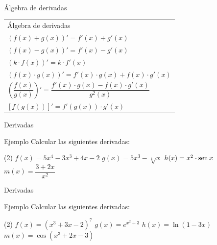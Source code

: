 \documentclass[8pt]{beamer}
\newcommand{\sen}{\mathop{\rm sen}\nolimits}
\begin{document}
\begin{frame}{Álgebra de derivadas}

\setlength{\arrayrulewidth}{0.2mm}
\setlength{\tabcolsep}{10pt}
\renewcommand{\arraystretch}{2}
\begin{center}
\begin{tabular}{|p{8cm}|}
\hline
\rowcolor{lightgray} {\huge{Álgebra de derivadas}} \\

	 $\left( f(x)+g(x) \right)' =f'(x) + g'(x) $ \\
\rowcolor{verdep}	  $\left( f(x)-g(x) \right)' =f'(x) - g'(x) $ \\
	 $\left( k\cdot f(x) \right)' =k\cdot f'(x) $ \\
\rowcolor{verdep}	 $\left( f(x) \cdot g(x) \right)' =f'(x)\cdot g(x)  + f(x) \cdot g'(x) $ \\
   
	  $\left( \dfrac{f(x)}{g(x)} \right)' =\dfrac {f'(x)\cdot g(x)-f(x)\cdot  g'(x)}{g^2(x)} $ \\
\rowcolor{verdep}	 $ \left[ f\left(g(x) \right)\right]' =f'\left(g(x) \right) \cdot  g'(x) $ \\
\hline
\end{tabular}
\end{center}
\end{frame}

\begin{frame}[t]{Derivadas}
\begin{exampleblock}{Ejemplo}
Calcular las siguientes derivadas:
\begin{tasks}[label=\alph*)](2)
\task $f(x)=5x^4-3x^3+4x-2$
\task $g(x)= 5x^3-\sqrt[4]{x}$
\task $h(x)= x^2 \cdot \sen x$
\task $m(x)=\dfrac{3+2x}{x^2}$
\end{tasks}
\end{exampleblock}
\end{frame}

\begin{frame}[t]{Derivadas}
\begin{exampleblock}{Ejemplo}
Calcular las siguientes derivadas:
\begin{tasks}[label=\alph*)](2)
\task $f(x)= (x^3+3x-2)^7 $
\task $g(x)= e^{x^2+3}$
\task $h(x)= \ln (1-3x)$
\task $m(x)= \cos (x^3+2x-3)$
\end{tasks}
\end{exampleblock}
\end{frame}
\end{document}
